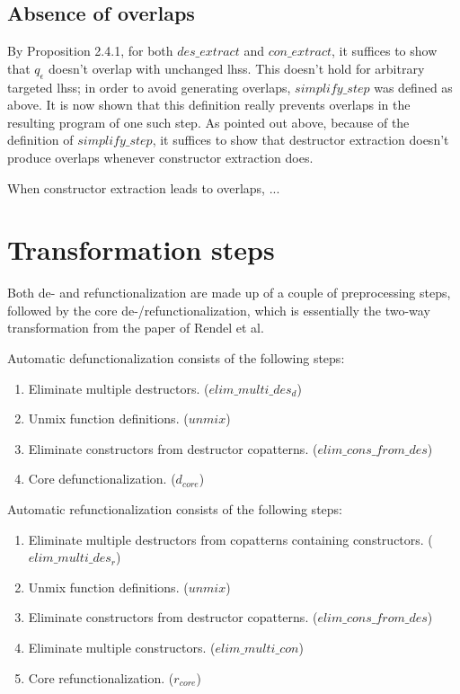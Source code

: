 \subsection{Absence of overlaps}

By Proposition 2.4.1, for both $des\_extract$ and $con\_extract$, it suffices to show that $q_\epsilon$ doesn't overlap with unchanged lhss. This doesn't hold for arbitrary targeted lhss; in order to avoid generating overlaps, $simplify\_step$ was defined as above. It is now shown that this definition really prevents overlaps in the resulting program of one such step. As pointed out above, because of the definition of $simplify\_step$, it suffices to show that destructor extraction doesn't produce overlaps whenever constructor extraction does.

When constructor extraction leads to overlaps, ...

\section{Transformation steps}

Both de- and refunctionalization are made up of a couple of preprocessing steps, followed by the core de-/refunctionalization, which is essentially the two-way transformation from the paper of Rendel et al.

Automatic defunctionalization consists of the following steps:
\begin{enumerate}
\item Eliminate multiple destructors. ($elim\_multi\_des_d$)

\item Unmix function definitions. ($unmix$)

\item Eliminate constructors from destructor copatterns. ($elim\_cons\_from\_des$)

\item Core defunctionalization. ($d_{core}$)

\end{enumerate}

Automatic refunctionalization consists of the following steps:
\begin{enumerate}
\item Eliminate multiple destructors from copatterns containing constructors. ($elim\_multi\_des_r$)

\item Unmix function definitions. ($unmix$)

\item Eliminate constructors from destructor copatterns. ($elim\_cons\_from\_des$)

\item Eliminate multiple constructors. ($elim\_multi\_con$)

\item Core refunctionalization. ($r_{core}$)

\end{enumerate}

